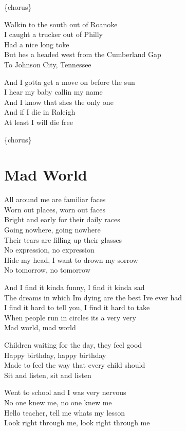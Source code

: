 \documentclass[
  letterpaper,
  twoside=false]{scrbook}
\begin{document}
\{chorus\}

Walkin\textquotesingle{} to the south out of Roanoke\\
I caught a trucker out of Philly\\
Had a nice long toke\\
But he\textquotesingle s a headed west from the Cumberland Gap\\
To Johnson City, Tennessee

And I gotta get a move on before the sun\\
I hear my baby callin\textquotesingle{} my name\\
And I know that she\textquotesingle s the only one\\
And if I die in Raleigh\\
At least I will die free

\{chorus\}

\hypertarget{mad-world}{%
\chapter{Mad World}\label{mad-world}}

All around me are familiar faces\\
Worn out places, worn out faces\\
Bright and early for their daily races\\
Going nowhere, going nowhere\\
Their tears are filling up their glasses\\
No expression, no expression\\
Hide my head, I want to drown my sorrow\\
No tomorrow, no tomorrow

And I find it kinda funny, I find it kinda sad\\
The dreams in which I\textquotesingle m dying are the best
I\textquotesingle ve ever had\\
I find it hard to tell you, I find it hard to take\\
When people run in circles it\textquotesingle s a very very\\
Mad world, mad world

Children waiting for the day, they feel good\\
Happy birthday, happy birthday\\
Made to feel the way that every child should\\
Sit and listen, sit and listen

Went to school and I was very nervous\\
No one knew me, no one knew me\\
Hello teacher, tell me what\textquotesingle s my lesson\\
Look right through me, look right through me
\end{document}

